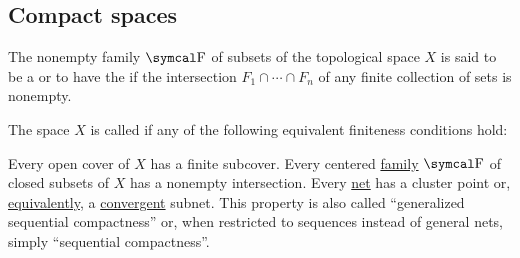 \subsection{Compact spaces}\label{subsec:compact_spaces}

\begin{definition}\label{def:centered_family}
  The nonempty family \( \CF \) of subsets of the topological space \( X \) is said to be a  or to have the  if the intersection \( F_1 \cap \cdots \cap F_n \) of any finite collection of sets is nonempty.
\end{definition}

\begin{definition}\label{def:compact_space}
  The space \( X \) is called  if any of the following equivalent finiteness conditions hold:
  \begin{DefEnum}
     Every open cover of \( X \) has a finite subcover.
     Every centered \hyperref[def:centered_family]{family} \( \CF \) of closed subsets of \( X \) has a nonempty intersection.
     Every \hyperref[def:topological_net]{net} has a cluster point or, \hyperref[thm:net_convergence_properties/cluster_point_iff_subnet_limit_point]{equivalently}, a \hyperref[def:net_convergence]{convergent} subnet. This property is also called \enquote{generalized sequential compactness} or, when restricted to sequences instead of general nets, simply \enquote{sequential compactness}.
  \end{DefEnum}
\end{definition}
